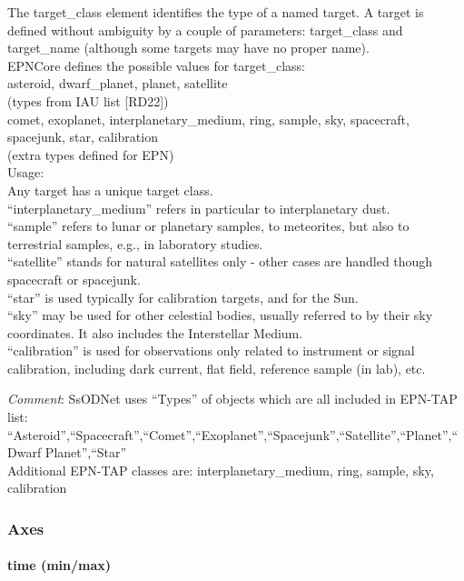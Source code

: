 \documentclass[11pt,a4paper]{ivoa}
\begin{document}
The target\_class element identifies the type of a named target. A target is defined without ambiguity by a couple of parameters: target\_class and target\_name (although some targets may have no proper name). \\ EPNCore defines the possible values for target\_class: \\ asteroid, dwarf\_planet, planet, satellite\\ (types from IAU list [RD22])\\ comet, exoplanet, interplanetary\_medium, ring, sample, sky, spacecraft, spacejunk, star, calibration \\ (extra types defined for EPN) \\ Usage:\\ Any target has a unique target class.\\ ``interplanetary\_medium'' refers in particular to interplanetary dust.\\ ``sample'' refers to lunar or planetary samples, to meteorites, but also to terrestrial samples, e.g., in laboratory studies.\\ ``satellite'' stands for natural satellites only - other cases are handled though spacecraft or spacejunk.\\ ``star'' is used typically for calibration targets, and for the Sun.\\ ``sky'' may be used for other celestial bodies, usually referred to by their sky coordinates. It also includes the Interstellar Medium.\\``calibration'' is used for observations only related to instrument or signal calibration, including dark current, flat field, reference sample (in lab), etc.

\emph{Comment}: SsODNet uses ``Types'' of objects which are all included in EPN-TAP list: ``Asteroid'',``Spacecraft'',``Comet'',``Exoplanet'',``Spacejunk'',``Satellite'',``Planet'',``Dwarf Planet'',``Star''\\Additional EPN-TAP classes are: interplanetary\_medium, ring, sample, sky, calibration \\

\subsubsection{Axes \\}

\paragraph{time (min/max)}
\end{document}
